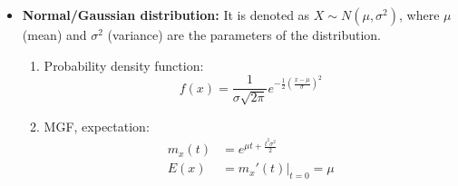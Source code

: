\documentclass[a4paper]{article}
\begin{document}
\begin{itemize}
\begin{enumerate}
    \end{enumerate}
     \item \textbf{Normal/Gaussian distribution:} It is denoted as $X\sim N(\mu,\sigma^2)$, where $\mu$(mean) and $\sigma^2$ (variance) are the parameters of the distribution.
     \begin{enumerate}
         \item Probability density function:
         \begin{equation*}
             f(x) = \frac{1}{\sigma\sqrt{2\pi}}e^{-\frac{1}{2}\left(\frac{x-\mu}{\sigma}\right)^2}
         \end{equation*}
         \item MGF, expectation:
         \begin{align*}
             m_x(t) &= e^{\mu t+\frac{t^2\sigma^2}{2}}\\
             E(x) &= m_x'(t)\Bigr\rvert_{t=0} = \mu
         \end{align*}
     \end{enumerate}
    

\end{itemize}
\end{document}
